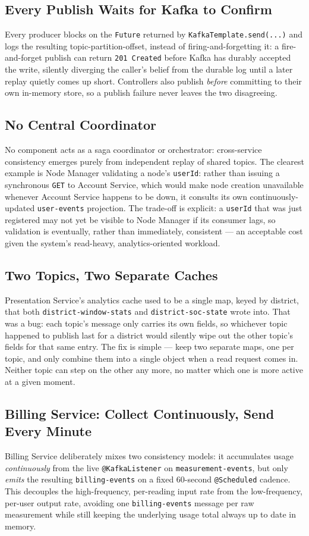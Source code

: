\subsection*{Every Publish Waits for Kafka to Confirm}
Every producer blocks on the \texttt{Future} returned by \texttt{KafkaTemplate.send(...)} and logs
the resulting topic-partition-offset, instead of firing-and-forgetting it: a fire-and-forget
publish can return \texttt{201 Created} before Kafka has durably accepted the write, silently
diverging the caller's belief from the durable log until a later replay quietly comes up short.
Controllers also publish \emph{before} committing to their own in-memory store, so a publish
failure never leaves the two disagreeing.

\subsection*{No Central Coordinator}
No component acts as a saga coordinator or orchestrator: cross-service consistency emerges purely
from independent replay of shared topics. The clearest example is Node Manager validating a
node's \texttt{userId}: rather than issuing a synchronous \texttt{GET} to Account Service, which
would make node creation unavailable whenever Account Service happens to be down, it consults its
own continuously-updated \texttt{user-events} projection. The trade-off is explicit: a
\texttt{userId} that was just registered may not yet be visible to Node Manager if its consumer
lags, so validation is eventually, rather than immediately, consistent --- an acceptable cost
given the system's read-heavy, analytics-oriented workload.

\subsection*{Two Topics, Two Separate Caches}
Presentation Service's analytics cache used to be a single map, keyed by district, that both
\texttt{district-window-stats} and \texttt{district-soc-state} wrote into. That was a bug: each
topic's message only carries its own fields, so whichever topic happened to publish last for a
district would silently wipe out the other topic's fields for that same entry. The fix is simple
--- keep two separate maps, one per topic, and only combine them into a single object when a read
request comes in. Neither topic can step on the other any more, no matter which one is more
active at a given moment.

\subsection*{Billing Service: Collect Continuously, Send Every Minute}
Billing Service deliberately mixes two consistency models: it accumulates usage
\emph{continuously} from the live \texttt{@KafkaListener} on \texttt{measurement-events}, but only
\emph{emits} the resulting \texttt{billing-events} on a fixed 60-second \texttt{@Scheduled}
cadence. This decouples the high-frequency, per-reading input rate from the low-frequency,
per-user output rate, avoiding one \texttt{billing-events} message per raw measurement while still
keeping the underlying usage total always up to date in memory.
